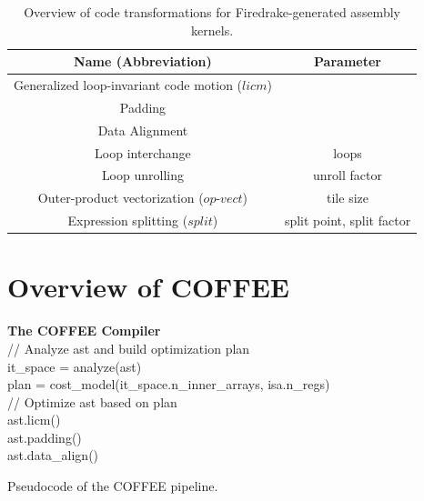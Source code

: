 \documentclass[conference]{IEEEtran}
\begin{document}
\begin{table}[h]
\begin{center}
\begin{tabulary}{1.0\columnwidth}{|C|C|}
\hline
Name (Abbreviation) & Parameter \\\hline\hline
Generalized loop-invariant code motion ($licm$) &   \\ \hline
Padding &  \\ \hline
Data Alignment & \\ \hline
Loop interchange      & loops  \\ \hline
Loop unrolling  & unroll factor \\ \hline
Outer-product vectorization ($op$-$vect$) & tile size \\ \hline
Expression splitting ($split$) & split point, split factor \\ \hline
\end{tabulary}
\end{center}
\caption{Overview of code transformations for Firedrake-generated assembly kernels.}
\label{table:code-transformations}
\end{table}


\section{Overview of COFFEE}
\label{sec:pyop2-compiler}

\begin{algorithm}[t]
\label{algo:PyOP2Compiler}
  \textbf{The COFFEE Compiler}\\
// Analyze ast and build optimization plan \\
it\_space = analyze(ast) \\
plan = cost\_model(it\_space.n\_inner\_arrays, isa.n\_regs) \\
// Optimize ast based on plan \\
ast.licm() \\
ast.padding() \\
ast.data\_align() \\
\caption{Pseudocode of the COFFEE pipeline.}
\end{algorithm}
\end{document}
